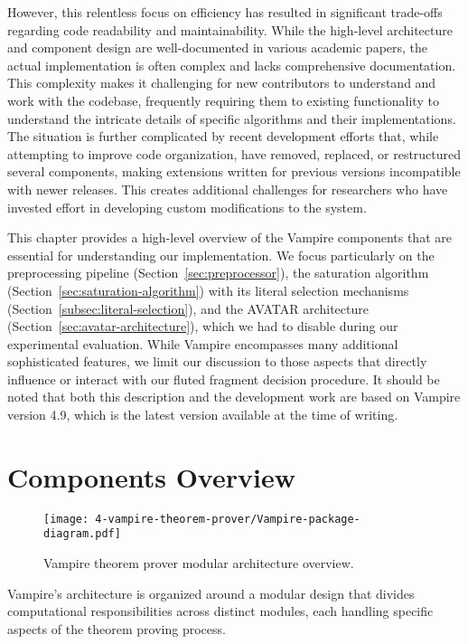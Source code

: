 However, this relentless focus on efficiency has resulted in significant trade-offs regarding code readability and maintainability.
While the high-level architecture and component design are well-documented in various academic papers, the actual implementation is often complex and lacks comprehensive documentation.
This complexity makes it challenging for new contributors to understand and work with the codebase, frequently requiring them to  existing functionality to understand the intricate details of specific algorithms and their implementations.
The situation is further complicated by recent development efforts that, while attempting to improve code organization, have removed, replaced, or restructured several components, making extensions written for previous versions incompatible with newer releases.
This creates additional challenges for researchers who have invested effort in developing custom modifications to the system.

This chapter provides a high-level overview of the Vampire components that are essential for understanding our implementation.
We focus particularly on the preprocessing pipeline (Section~\ref{sec:preprocessor}), the saturation algorithm (Section~\ref{sec:saturation-algorithm}) with its literal selection mechanisms (Section~\ref{subsec:literal-selection}), and the AVATAR architecture (Section~\ref{sec:avatar-architecture}), which we had to disable during our experimental evaluation.
While Vampire encompasses many additional sophisticated features, we limit our discussion to those aspects that directly influence or interact with our fluted fragment decision procedure.
It should be noted that both this description and the development work are based on Vampire version 4.9, which is the latest version available at the time of writing.

\section{Components Overview}\label{sec:components-overview}

\begin{figure}[H]
  \centering
  \texttt{[image: 4-vampire-theorem-prover/Vampire-package-diagram.pdf]}
  \caption{Vampire theorem prover modular architecture overview.}\label{fig:vampire-architecture}
\end{figure}

Vampire's architecture is organized around a modular design that divides computational responsibilities across distinct modules, each handling specific aspects of the theorem proving process.

